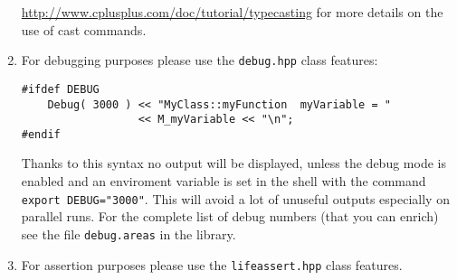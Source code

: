 \documentclass[10p]{article}
\begin{document}
\begin{enumerate}
  \url{http://www.cplusplus.com/doc/tutorial/typecasting} for more details on the use of cast commands.
  \item For debugging purposes please use the \texttt{debug.hpp} class features:
\begin{lstlisting}
#ifdef DEBUG
    Debug( 3000 ) << "MyClass::myFunction  myVariable = "
                  << M_myVariable << "\n";
#endif
\end{lstlisting}
  Thanks to this syntax no output will be displayed, unless the debug mode is enabled and an enviroment variable is set in the shell with the command \texttt{export DEBUG="3000"}. This will avoid a lot of unuseful outputs especially on parallel runs. For the complete list of debug numbers (that you can enrich) see the file \texttt{debug.areas} in the library.
  \item For assertion purposes please use the \texttt{lifeassert.hpp} class features.
\end{enumerate}
\end{document}
